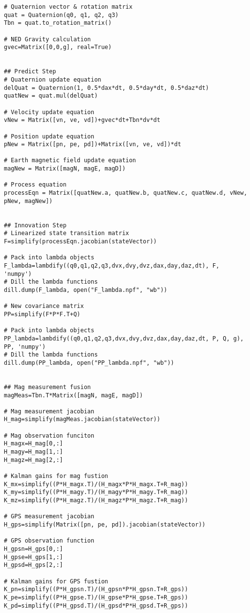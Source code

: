 \begin{verbatim}
# Quaternion vector & rotation matrix
quat = Quaternion(q0, q1, q2, q3)
Tbn = quat.to_rotation_matrix()

# NED Gravity calculation
gvec=Matrix([0,0,g], real=True)


## Predict Step
# Quaternion update equation
delQuat = Quaternion(1, 0.5*dax*dt, 0.5*day*dt, 0.5*daz*dt)
quatNew = quat.mul(delQuat)

# Velocity update equation
vNew = Matrix([vn, ve, vd])+gvec*dt+Tbn*dv*dt

# Position update equation
pNew = Matrix([pn, pe, pd])+Matrix([vn, ve, vd])*dt

# Earth magnetic field update equation
magNew = Matrix([magN, magE, magD])

# Process equation
processEqn = Matrix([quatNew.a, quatNew.b, quatNew.c, quatNew.d, vNew, pNew, magNew])


## Innovation Step
# Linearized state transition matrix
F=simplify(processEqn.jacobian(stateVector))

# Pack into lambda objects
F_lambda=lambdify((q0,q1,q2,q3,dvx,dvy,dvz,dax,day,daz,dt), F, 'numpy')
# Dill the lambda functions
dill.dump(F_lambda, open("F_lambda.npf", "wb"))

# New covariance matrix
PP=simplify(F*P*F.T+Q)

# Pack into lambda objects
PP_lambda=lambdify((q0,q1,q2,q3,dvx,dvy,dvz,dax,day,daz,dt, P, Q, g), PP, 'numpy')
# Dill the lambda functions
dill.dump(PP_lambda, open("PP_lambda.npf", "wb"))


## Mag measurement fusion
magMeas=Tbn.T*Matrix([magN, magE, magD])

# Mag measurement jacobian
H_mag=simplify(magMeas.jacobian(stateVector))

# Mag observation funciton
H_magx=H_mag[0,:]
H_magy=H_mag[1,:]
H_magz=H_mag[2,:]

# Kalman gains for mag fustion
K_mx=simplify((P*H_magx.T)/(H_magx*P*H_magx.T+R_mag))
K_my=simplify((P*H_magy.T)/(H_magy*P*H_magy.T+R_mag))
K_mz=simplify((P*H_magz.T)/(H_magz*P*H_magz.T+R_mag))

# GPS measurement jacobian
H_gps=simplify(Matrix([pn, pe, pd]).jacobian(stateVector))

# GPS observation function
H_gpsn=H_gps[0,:]
H_gpse=H_gps[1,:]
H_gpsd=H_gps[2,:]

# Kalman gains for GPS fustion
K_pn=simplify((P*H_gpsn.T)/(H_gpsn*P*H_gpsn.T+R_gps))
K_pe=simplify((P*H_gpse.T)/(H_gpse*P*H_gpse.T+R_gps))
K_pd=simplify((P*H_gpsd.T)/(H_gpsd*P*H_gpsd.T+R_gps))



\end{verbatim}
